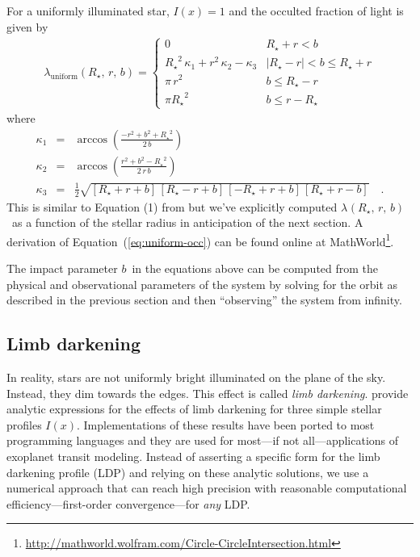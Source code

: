 \documentclass[12pt,preprint]{aastex}
\newcommand{\project}[1]{{\sffamily #1}}
\newcommand{\Eq}[1]{Equation~(\ref{eq:#1})}
\newcommand{\eq}[1]{\Eq{#1}}
\newcommand{\eqlabel}[1]{\label{eq:#1}}
\newcommand{\rstar}{\ensuremath{R_\star}}
\newcommand{\rplanet}{\ensuremath{r}}
\newcommand{\impactpar}{\ensuremath{b}}
\newcommand{\occbase}[2]{\ensuremath{\lambda_{#1}(#2,\,\rplanet,\,\impactpar)}}
\newcommand{\occ}[1]{\occbase{#1}{\rstar}}
\newcommand{\occultation}{\occ{}}
\newcommand{\occuniform}{\occ{\mathrm{uniform}}}
\newcommand{\rsurface}{\ensuremath{x}}
\newcommand{\ldp}{\ensuremath{I(\rsurface)}}
\begin{document}
For a uniformly illuminated star, $\ldp = 1$ and the occulted fraction of
light is given by
\begin{eqnarray}\eqlabel{uniform-occ}
    \occuniform = \left \{ \begin{array}{ll}
            0 & \rstar + \rplanet < \impactpar \\
            \rstar^2 \, \kappa_1 + \rplanet^2 \, \kappa_2 - \kappa_3
                & |\rstar - \rplanet| < \impactpar \leq \rstar + \rplanet \\
            \pi \, \rplanet^2 & \impactpar \leq \rstar - \rplanet \\
            \pi \rstar^2 & \impactpar \leq \rplanet - \rstar
        \end{array} \right.
\end{eqnarray}
where
\begin{eqnarray}
    \kappa_1 & = & \arccos \left ( \frac{-\rplanet^2 + \impactpar^2
                                        + \rstar^2}{2\,\impactpar} \right ) \\
    \kappa_2 & = & \arccos \left ( \frac{\rplanet^2 + \impactpar^2
                            - \rstar^2}{2\,\rplanet\,\impactpar} \right ) \\
    \kappa_3 & = & \frac{1}{2} \sqrt{[\rstar + \rplanet + \impactpar] \,
                            [\rstar - \rplanet + \impactpar]
                        \, [-\rstar + \rplanet + \impactpar] \, [\rstar +
                            \rplanet - \impactpar]} \quad.
\end{eqnarray}
This is similar to Equation (1) from \citet{mandel} but we've explicitly
computed \occultation\ as a function of the stellar radius in anticipation
of the next section.
A derivation of \eq{uniform-occ} can be found online at
\project{MathWorld}\footnote{%
\url{http://mathworld.wolfram.com/Circle-CircleIntersection.html}}.

The impact parameter \impactpar\ in the equations above can be computed from
the physical and observational parameters of the system by solving for the
orbit as described in the previous section and then ``observing'' the system
from infinity.


\subsection{Limb darkening}

In reality, stars are not uniformly bright illuminated on the plane of the
sky.
Instead, they dim towards the edges.
This effect is called \emph{limb darkening}.
\citet{mandel} provide analytic expressions for the
effects of limb darkening for three simple stellar profiles \ldp.
Implementations of these results have been ported to most programming
languages and they are used for most---if not all---applications of exoplanet
transit modeling.
Instead of asserting a specific form for the limb darkening
profile (LDP) and relying on these analytic solutions, we use a numerical
approach that can reach high precision with reasonable computational
efficiency---first-order convergence---for \emph{any} LDP.
\end{document}
